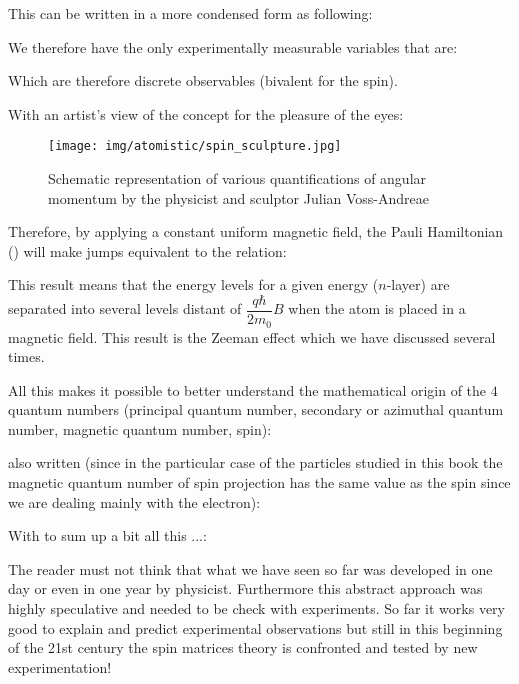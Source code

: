 	This can be written in a more condensed form as following:
	
	We therefore have the only experimentally measurable variables that are:
	
	Which are therefore discrete observables (bivalent for the spin).

	With an artist's view of the concept for the pleasure of the eyes:
	\begin{figure}[H]
		\centering
		\texttt{[image: img/atomistic/spin\_sculpture.jpg]}	
		\caption{Schematic representation of various quantifications of angular momentum by the physicist and sculptor Julian Voss-Andreae}
	\end{figure}
	Therefore, by applying a constant uniform magnetic field, the Pauli Hamiltonian () will make jumps equivalent to the relation:
	
	This result means that the energy levels for a given energy ($n$-layer) are separated into several levels distant of $\dfrac{q\hbar}{2m_0}B$ when the atom is placed in a magnetic field. This result is the Zeeman effect which we have discussed several times.
	
	All this makes it possible to better understand the mathematical origin of the $4$ quantum numbers (principal quantum number, secondary or azimuthal quantum number, magnetic quantum number, spin):
	
	also written (since in the particular case of the particles studied in this book the magnetic quantum number of spin projection has the same value as the spin since we are dealing mainly with the electron):
	
	With to sum up a bit all this ...:
	
	The reader must not think that what we have seen so far was developed in one day or even in one year by physicist. Furthermore this abstract approach was highly speculative and needed to be check with experiments. So far it works very good to explain and predict experimental observations but still in this beginning of the 21st century the spin matrices theory is confronted and tested by new experimentation!
	
	\pagebreak
